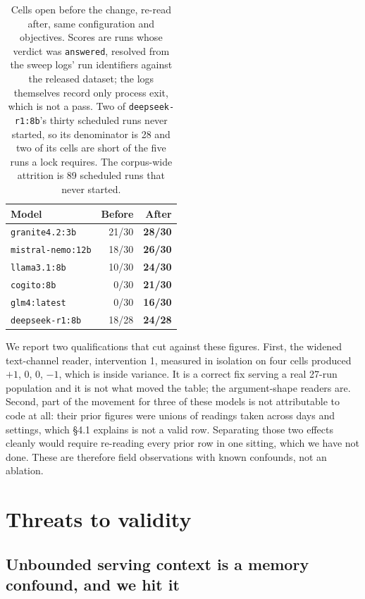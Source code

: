 \documentclass[11pt]{article}
\newcommand{\code}[1]{\texttt{\small #1}}
\begin{document}
\begin{table}[htbp]
\centering\small
\begin{tabular}{@{}lrr@{}}
\toprule
Model & Before & After \\
\midrule
\code{granite4.2:3b} & 21/30 & \textbf{28/30} \\
\code{mistral-nemo:12b} & 18/30 & \textbf{26/30} \\
\code{llama3.1:8b} & 10/30 & \textbf{24/30} \\
\code{cogito:8b} & 0/30 & \textbf{21/30} \\
\code{glm4:latest} & 0/30 & \textbf{16/30} \\
\code{deepseek-r1:8b} & 18/28 & \textbf{24/28} \\
\bottomrule
\end{tabular}
\caption{Cells open before the change, re-read after, same configuration and objectives. Scores are runs whose
verdict was \code{answered}, resolved from the sweep logs' run identifiers against the released dataset; the logs
themselves record only process exit, which is not a pass. Two of \code{deepseek-r1:8b}'s thirty scheduled runs
never started, so its denominator is 28 and two of its cells are short of the five runs a lock requires. The
corpus-wide attrition is 89 scheduled runs that never started.}
\end{table}

We report two qualifications that cut against these figures. First, the widened text-channel reader,
intervention 1, measured in isolation on four cells produced $+1$, $0$, $0$, $-1$, which is inside variance. It
is a correct fix serving a real 27-run population and it is not what moved the table; the argument-shape readers
are. Second, part of the movement for three of these models is not attributable to code at all: their prior
figures were unions of readings taken across days and settings, which \S4.1 explains is not a valid row.
Separating those two effects cleanly would require re-reading every prior row in one sitting, which we have not
done. These are therefore field observations with known confounds, not an ablation.

\section{Threats to validity}

\subsection{Unbounded serving context is a memory confound, and we hit it}
\label{sec:memory}
\end{document}

